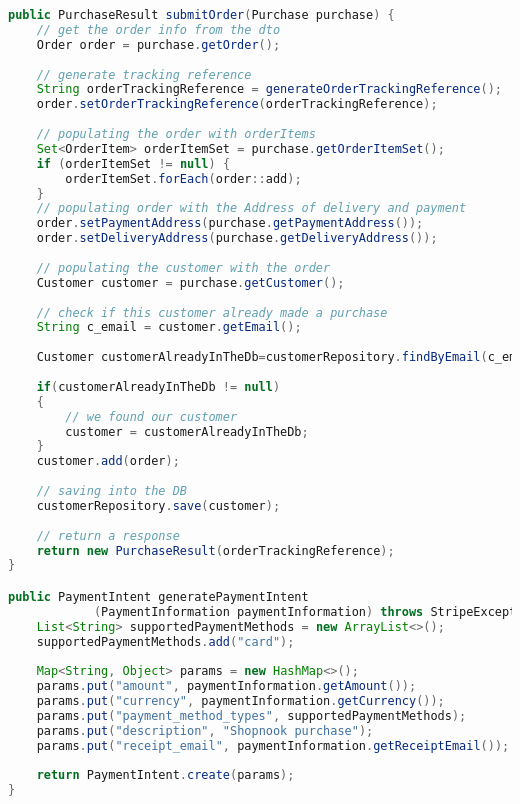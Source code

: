 \begin{lstlisting}[language=Java, label=listing3.15, caption=Java-Code für die Übermittlung von bestellungen und die Generierung von Zahlungsanweisungen]
public PurchaseResult submitOrder(Purchase purchase) {
	// get the order info from the dto
	Order order = purchase.getOrder();
	
	// generate tracking reference
	String orderTrackingReference = generateOrderTrackingReference();
	order.setOrderTrackingReference(orderTrackingReference);
	
	// populating the order with orderItems
	Set<OrderItem> orderItemSet = purchase.getOrderItemSet();
	if (orderItemSet != null) {
		orderItemSet.forEach(order::add);
	}
	// populating order with the Address of delivery and payment
	order.setPaymentAddress(purchase.getPaymentAddress());
	order.setDeliveryAddress(purchase.getDeliveryAddress());
	
	// populating the customer with the order
	Customer customer = purchase.getCustomer();
	
	// check if this customer already made a purchase
	String c_email = customer.getEmail();
	
	Customer customerAlreadyInTheDb=customerRepository.findByEmail(c_email);
	
	if(customerAlreadyInTheDb != null)
	{
		// we found our customer
		customer = customerAlreadyInTheDb;
	}
	customer.add(order);
	
	// saving into the DB
	customerRepository.save(customer);
	
	// return a response
	return new PurchaseResult(orderTrackingReference);
}

public PaymentIntent generatePaymentIntent
			(PaymentInformation paymentInformation) throws StripeException {
	List<String> supportedPaymentMethods = new ArrayList<>();
	supportedPaymentMethods.add("card");
	
	Map<String, Object> params = new HashMap<>();
	params.put("amount", paymentInformation.getAmount());
	params.put("currency", paymentInformation.getCurrency());
	params.put("payment_method_types", supportedPaymentMethods);
	params.put("description", "Shopnook purchase");
	params.put("receipt_email", paymentInformation.getReceiptEmail());
	
	return PaymentIntent.create(params);
}
\end{lstlisting}



